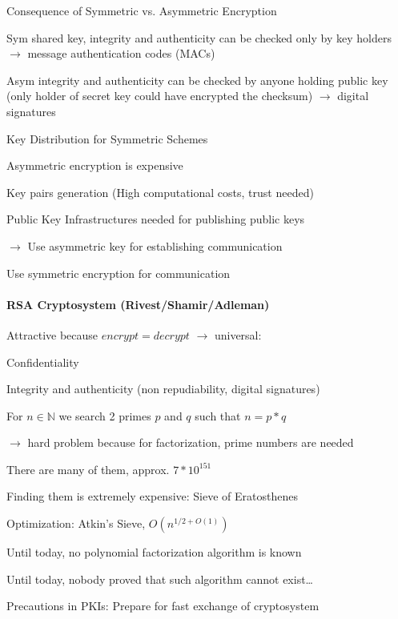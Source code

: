 \documentclass[a4paper]{article}
\begin{document}
\begin{multicols}{3}
    Consequence of Symmetric vs. Asymmetric Encryption
    \begin{itemize*}
        \item[Sym] shared key, integrity and authenticity can be checked only by key holders $\rightarrow$ message authentication codes (MACs)
        \item[Asym] integrity and authenticity can be checked by anyone holding public key (only holder of secret key could have encrypted the checksum) $\rightarrow$ digital signatures
    \end{itemize*}

    Key Distribution for Symmetric Schemes
    \begin{itemize*}
        \item Asymmetric encryption is expensive
        \item Key pairs generation (High computational costs, trust needed)
        \item Public Key Infrastructures needed for publishing public keys
        \item[$\rightarrow$] Use asymmetric key for establishing communication
        \item Use symmetric encryption for communication
    \end{itemize*}

    \paragraph{RSA Cryptosystem (Rivest/Shamir/Adleman)}
    Attractive because $encrypt=decrypt$ $\rightarrow$ universal:
    \begin{enumerate*}
        \item Confidentiality
        \item Integrity and authenticity (non repudiability, digital signatures)
    \end{enumerate*}
    For $n\in\mathbb{N}$ we search 2 primes $p$ and $q$ such that $n=p*q$
    \begin{itemize*}
        \item[$\rightarrow$] hard problem because for factorization, prime numbers are needed
        \item There are many of them, approx. $7*10^{151}$
        \item Finding them is extremely expensive: Sieve of Eratosthenes
        \item Optimization: Atkin’s Sieve, $O(n^{1/2+O(1)})$
        \item Until today, no polynomial factorization algorithm is known
        \item Until today, nobody proved that such algorithm cannot exist\dots
    \end{itemize*}
    Precautions in PKIs: Prepare for fast exchange of cryptosystem


\end{multicols}
\end{document}
